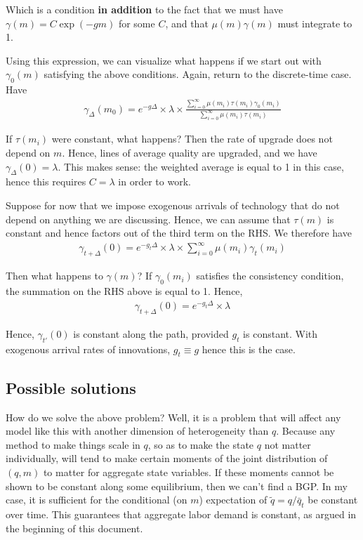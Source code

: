 \documentclass[12pt,english]{article}
\theoremstyle{remark}
\begin{document}
\begin{itemize}
	Which is a condition \textbf{in addition }to the fact that we must have $\gamma(m) = C\exp(-gm)$ for some $C$, and that $\mu(m)\gamma(m)$ must integrate to 1. 
	
	Using this expression, we can visualize what happens if we start out with $\gamma_0(m)$ satisfying the above conditions. Again, return to the discrete-time case. Have 
	\begin{align*}
		\gamma_{\Delta}(m_0) = e^{-g\Delta} \times \lambda \times \frac{\sum_{i=0}^{\infty} \mu(m_i) \tau(m_i) \gamma_0(m_i)}{\sum_{i=0}^{\infty}\mu(m_i)\tau(m_i)}
	\end{align*}
	
	If $\tau(m_i)$ were constant, what happens? Then the rate of upgrade does not depend on $m$. Hence, lines of average quality are upgraded, and we have $\gamma_{\Delta}(0) = \lambda$. This makes sense: the weighted average is equal to 1 in this case, hence this requires $C = \lambda$ in order to work.
	
	Suppose for now that we impose exogenous arrivals of technology that do not depend on anything we are discussing. Hence, we can assume that $\tau(m)$ is constant and hence factors out of the third term on the RHS. We therefore have 
	\begin{align*}
		\gamma_{t+\Delta} (0) = e^{-g_t\Delta} \times \lambda \times \sum_{i=0}^{\infty} \mu(m_i) \gamma_t(m_i) 
	\end{align*}
	
	Then what happens to $\gamma(m)$? If $\gamma_0(m_i)$ satisfies the consistency condition, the summation on the RHS above is equal to 1. Hence, 
	\begin{align*}
		\gamma_{t+\Delta}(0) = e^{-g_t \Delta} \times \lambda
	\end{align*}

	Hence, $\gamma_{t'} (0)$ is constant along the path, provided $g_t$ is constant. With exogenous arrival rates of innovations, $g_t \equiv g$ hence this is the case.
	
\end{itemize}

\subsection{Possible solutions}

How do we solve the above problem? Well, it is a problem that will affect any model like this with another dimension of heterogeneity than $q$. Because any method to make things scale in $q$, so as to make the state $q$ not matter individually, will tend to make certain moments of the joint distribution of $(q,m)$ to matter for aggregate state variables. If these moments cannot be shown to be constant along some equilibrium, then we can't find a BGP. In my case, it is sufficient for the conditional (on $m$) expectation of $\tilde{q} = q / \bar{q}_t$ be constant over time. This guarantees that aggregate labor demand is constant, as argued in the beginning of this document.  
\end{document}
